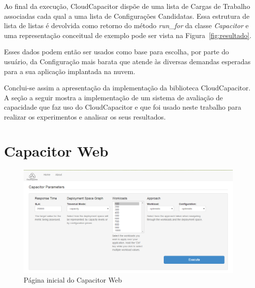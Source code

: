 Ao final da execução, CloudCapacitor dispõe de uma lista de Cargas de Trabalho 
associadas cada qual a uma lista de Configurações Candidatas. Essa estrutura de
lista de listas é devolvida como retorno do método \emph{run\_for} da classe 
\emph{Capacitor} e uma representação conceitual de exemplo pode ser vista na 
Figura~\ref{fig:resultado}. 

Esses dados podem então ser usados como base para escolha, por parte do usuário,
da Configuração mais barata que atende às diversas demandas esperadas para a 
sua aplicação implantada na nuvem.

Conclui-se assim a apresentação da implementação da biblioteca CloudCapacitor. A
seção a seguir mostra a implementação de um sistema de avaliação de capacidade 
que faz uso do CloudCapacitor e que foi usado neste trabalho para realizar os
experimentos e analisar os seus resultados.

\section{Capacitor Web}

\begin{figure}[htb]
  \caption{\label{fig:capacitor_web_front}Página inicial do Capacitor Web}
  \begin{center}
    \includegraphics[scale=0.5]{img/CapacitorWeb_Frontpage}
  \end{center}
\end{figure}


